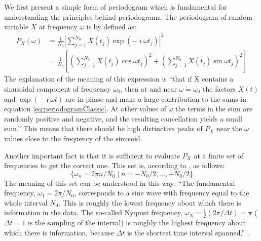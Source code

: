 We first present a simple form of periodogram which is fundamental for understanding the principles behind periodograms. The periodogram of random variable $X$ at frequency $\omega$ is by \citep{Scargle1982} defined as: 
\begin{align}
P_X(\omega) &= \frac{1}{N_0} {\left| \sum\limits_{j=1}^{N_0} X(t_j) \exp(-\imath\omega t_j) \right|}^2 \\
&= \frac{1}{N_0} \left[ \left( \sum\limits_{j=1}^{N_0} X(t_j)\cos\omega t_j \right)^2 + \left(\sum\limits_{j=1}^{N_0} X(t_j)\sin\omega t_j  \right)^2 \right]
\label{eq:periodogramClassic}
\end{align}
The explanation of the meaning of this expression is ``that if X contains a sinusoidal component of frequency $\omega_0$, then at and near $\omega = \omega_0$ the factors $X(t)$ and $\exp(-\imath\omega t)$ are in phase and make a large contribution to the sums in equation \eqref{eq:periodogramClassic}. At other values of $\omega$ the terms in the sum are randomly positive and negative, and the resulting cancellation yields a small sum.'' \citep[p.~836]{Scargle1982} This means that there should be high distinctive peaks of $P_X$ near the $\omega$ values close to the frequency of the sinusoid. 

Another important fact is that it is sufficient to evaluate $P_X$ at a finite set of frequencies to get the correct one. This set is, according to \citep[p.~850]{Scargle1982}, as follows:
$$ \lbrace \omega_n = 2\pi n / N_0 \mid n = -N_0/2, \ldots, +N_0/2 \rbrace $$
The meaning of this set can be understood in this way: ``The fundamental frequency, $\omega_1 = 2\pi / N_0$, corresponds to a sine wave with frequency equal to the whole interval $N_0$. This is roughly the lowest frequency about which there is information in the data. The so-called Nyquist frequency, $\omega_N = \frac{1}{2}(2\pi/{\Delta t}) = \pi$ ($\Delta t = 1$ is the sampling of the interval) is roughly the highest frequency about which there is information, because $\Delta t$ is the shortest time interval spanned.'' \citep[pp.~850--851]{Scargle1982}.

